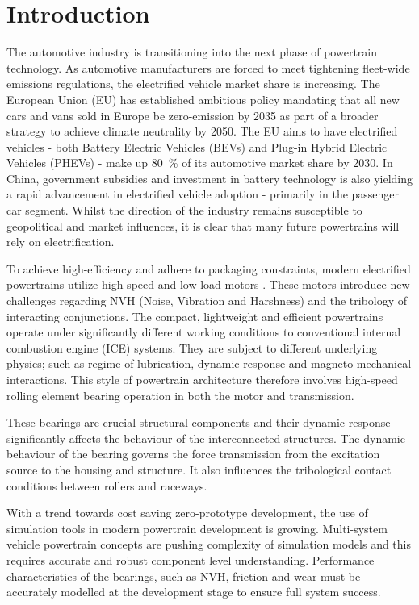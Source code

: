 \chapter{Introduction} \label{Introduction}

The automotive industry is transitioning into the next phase of powertrain technology. As automotive manufacturers are forced to meet tightening fleet-wide emissions regulations, the electrified vehicle market share is increasing. The European Union (EU) has established ambitious policy \cite{EUL110/5} mandating that all new cars and vans sold in Europe be zero-emission by 2035 as part of a broader strategy to achieve climate neutrality by 2050. The EU aims to have electrified vehicles - both Battery Electric Vehicles (BEVs) and Plug-in Hybrid Electric Vehicles (PHEVs) - make up 80~\% of its automotive market share by 2030. In China, government subsidies and investment in battery technology is also yielding a rapid advancement in electrified vehicle adoption - primarily in the passenger car segment. Whilst the direction of the industry remains susceptible to geopolitical and market influences, it is clear that many future powertrains will rely on electrification.

To achieve high-efficiency and adhere to packaging constraints, modern electrified powertrains utilize high-speed and low load motors \cite{Cai2021}. These motors introduce new challenges regarding NVH (Noise, Vibration and Harshness) and the tribology of interacting conjunctions. The compact, lightweight and efficient powertrains operate under significantly different working conditions to conventional internal combustion engine (ICE) systems. They are subject to different underlying physics; such as regime of lubrication, dynamic response and magneto-mechanical interactions. This style of powertrain architecture therefore involves high-speed rolling element bearing operation in both the motor and transmission.

These bearings are crucial structural components and their dynamic response significantly affects the behaviour of the interconnected structures. The dynamic behaviour of the bearing governs the force transmission from the excitation source to the housing and structure. It also influences the tribological contact conditions between rollers and raceways.

With a trend towards cost saving zero-prototype development, the use of simulation tools in modern powertrain development is growing. Multi-system vehicle powertrain concepts are pushing complexity of simulation models and this requires accurate and robust component level understanding. Performance characteristics of the bearings, such as NVH, friction and wear must be accurately modelled at the development stage to ensure full system success.


